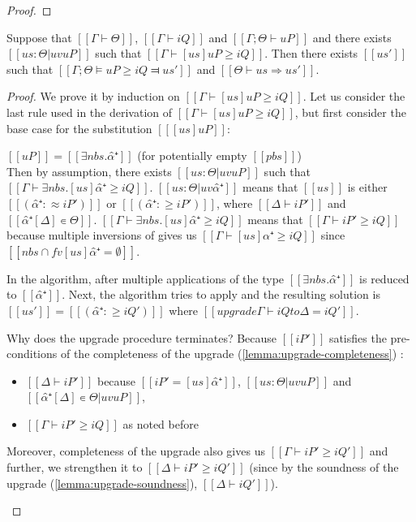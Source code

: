 \begin{theorem} \hfill
\end{theorem}
\begin{proof}
\end{proof}


\begin{lemma}
    Suppose that $[[Γ ⊢ Θ]]$, $[[Γ ⊢ iQ]]$ and $[[Γ ; Θ ⊢ uP]]$ and
    there exists $[[us : Θ | uv uP]]$ such that $[[ Γ ⊢ [us]uP ≥ iQ ]]$.
    Then there exists $[[us']]$ such that $[[Γ ; Θ ⊨ uP ≥ iQ ⫤ us']]$
    and $[[Θ ⊢ us ⇒ us']]$.
\end{lemma}
\begin{proof}
    We prove it by induction on $[[ Γ ⊢ [us]uP ≥ iQ ]]$.
    Let us consider the last rule used in the derivation of  $[[ Γ ⊢ [us]uP ≥ iQ ]]$,
    but first consider the base case for the substitution $[[ [us]uP ]]$:

    \begin{caseof}
        \item \label{case:subt-complete-base} $[[uP]] = [[ ∃nbs.α̂⁺ ]]$ (for potentially empty $[[pbs]]$)\\
        Then by assumption, there exists $[[us : Θ | uv uP]]$ such that $[[ Γ ⊢ ∃nbs.[us]α̂⁺ ≥ iQ ]]$.
        $[[us : Θ | uv α̂⁺]]$ means that  $[[us]]$ is either $[[ (α̂⁺ :≈ iP') ]]$ or $[[ (α̂⁺ :≥ iP') ]]$,
        where $[[Δ ⊢ iP']]$ and $[[α̂⁺[Δ] ∊ Θ]]$.
        $[[ Γ ⊢ ∃nbs.[us]α̂⁺ ≥ iQ ]]$ means that $[[Γ ⊢ iP' ≥ iQ]]$
        because multiple inversions of  
        gives us $[[Γ ⊢ [us]α̂⁺ ≥ iQ]]$ since $[[ {nbs} ∩ fv [us]α̂⁺ = ∅]]$.


        In the algorithm, after multiple applications of 
        the type $[[∃nbs.α̂⁺]]$ is reduced to $[[α̂⁺]]$.
        Next, the algorithm tries to apply
        and the resulting solution is $[[us']] = [[(α̂⁺ :≥ iQ')]]$ where
        $[[upgrade Γ ⊢ iQ to Δ = iQ']]$.

        Why does the upgrade procedure terminates?
        Because $[[iP']]$ satisfies the pre-conditions of the completeness of the upgrade
        (\cref{lemma:upgrade-completeness})
        :
        \begin{itemize}
            \item $[[Δ ⊢ iP']]$ because $[[iP' = [us]α̂⁺]]$, $[[us : Θ | uv uP]]$ and 
            $[[α̂⁺[Δ] ∊ Θ | uv uP]]$,
            \item $[[Γ ⊢ iP' ≥ iQ]]$ as noted before
        \end{itemize}
        Moreover, completeness of the upgrade also gives us $[[Γ ⊢ iP' ≥ iQ']]$
        and further, we strengthen it to $[[Δ ⊢ iP' ≥ iQ']]$
        (since by the soundness of the upgrade (\cref{lemma:upgrade-soundness}),
        $[[Δ ⊢ iQ']]$).


\end{caseof}
\end{proof}

